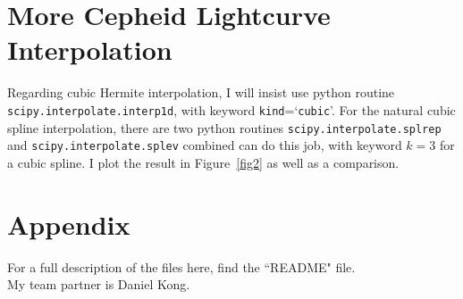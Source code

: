 \documentclass[11pt,letterpaper]{article}
\begin{document}
\section{More Cepheid Lightcurve Interpolation}
Regarding cubic Hermite interpolation, I will insist use python routine {\tt scipy.interpolate.interp1d}, with keyword {\tt kind}=`{\tt cubic}'. For the natural cubic spline interpolation, there are two python routines {\tt scipy.interpolate.splrep} and {\tt scipy.interpolate.splev} combined can do this job, with keyword $k=3$ for a cubic spline. I plot the result in Figure~\ref{fig2} as well as a comparison.


\small
\section*{Appendix}
For a full description of the files here, find the ``README" file. \\
My team partner is Daniel Kong.
\end{document}
